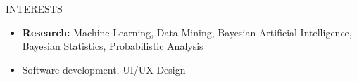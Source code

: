 \section{\faSoccerBallO}{INTERESTS}

\begin{itemize}[noitemsep]
    \item \textbf{Research:} Machine Learning, Data Mining, Bayesian Artificial Intelligence, Bayesian Statistics, Probabilistic Analysis 
    \item Software development, UI/UX Design
\end{itemize}